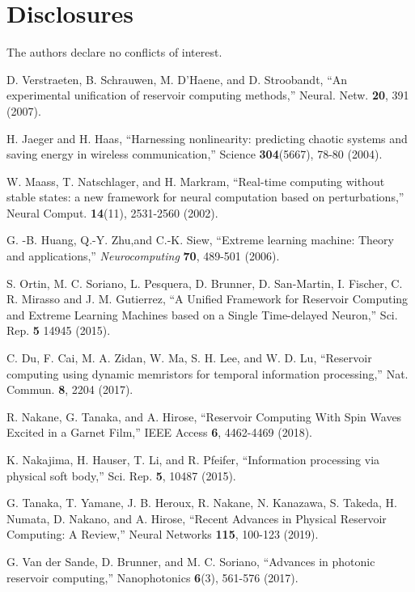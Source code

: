 \documentclass{article}
\begin{document}
\section*{Disclosures}
The authors declare no conflicts of interest.

\begin{thebibliography}{9}

D. Verstraeten, B. Schrauwen, M. D'Haene, and D. Stroobandt,
``An experimental unification of reservoir computing methods,''
Neural. Netw. {\bf 20}, 391 (2007).

H. Jaeger and H. Haas, 
``Harnessing nonlinearity: predicting chaotic systems and saving energy in wireless
communication,'' Science {\bf 304}(5667), 78-80 (2004).

W. Maass, T. Natschlager, and H. Markram, 
``Real-time computing without stable states: a new framework for
neural computation based on perturbations,'' 
Neural Comput. {\bf 14}(11), 2531-2560 (2002).

G. -B. Huang, Q.-Y. Zhu,and C.-K. Siew,
``Extreme learning machine: Theory and applications,''
{\it Neurocomputing} {\bf 70}, 489-501 (2006).

S. Ortin,
M. C. Soriano, L. Pesquera, D. Brunner, D. San-Martin, I. Fischer,
C. R. Mirasso and J. M. Gutierrez,
``A Unified Framework for Reservoir Computing and Extreme Learning
Machines based on a Single Time-delayed Neuron,''
Sci. Rep. {\bf 5} 14945 (2015).

C. Du, F. Cai, M. A. Zidan, W. Ma, S. H. Lee, and W. D. Lu, 
``Reservoir computing using dynamic memristors for temporal information
	processing,''
Nat. Commun. {\bf 8}, 2204 (2017). 

R. Nakane, G. Tanaka, and A. Hirose,
``Reservoir Computing With Spin Waves Excited in a Garnet Film,''
IEEE Access {\bf 6}, 4462-4469 (2018).

K. Nakajima, H. Hauser, T. Li, and R. Pfeifer, 
``Information processing via physical soft body,'' 
Sci. Rep. {\bf 5}, 10487 (2015).

G. Tanaka, T. Yamane, J. B. Heroux, R. Nakane, N. Kanazawa, S. Takeda,
H. Numata, D. Nakano, and A. Hirose,
``Recent Advances in Physical Reservoir Computing: A Review,''
Neural Networks {\bf 115}, 100-123 (2019).

G. Van der Sande, D. Brunner, and M. C. Soriano,
``Advances in photonic reservoir computing,''
Nanophotonics {\bf 6}(3), 561-576 (2017).


\end{thebibliography}
\end{document}
